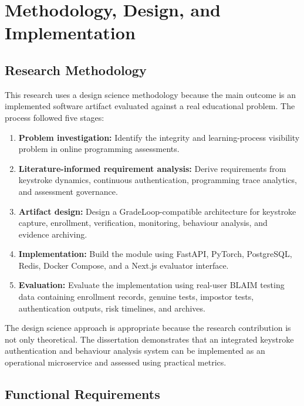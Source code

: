 \chapter{Methodology, Design, and Implementation}
\label{chap:methodology}

\section{Research Methodology}
\label{sec:methodology}

This research uses a design science methodology because the main outcome is an implemented software artifact evaluated against a real educational problem. The process followed five stages:

\begin{enumerate}
  \item \textbf{Problem investigation:} Identify the integrity and learning-process visibility problem in online programming assessments.
  \item \textbf{Literature-informed requirement analysis:} Derive requirements from keystroke dynamics, continuous authentication, programming trace analytics, and assessment governance.
  \item \textbf{Artifact design:} Design a GradeLoop-compatible architecture for keystroke capture, enrollment, verification, monitoring, behaviour analysis, and evidence archiving.
  \item \textbf{Implementation:} Build the module using FastAPI, PyTorch, PostgreSQL, Redis, Docker Compose, and a Next.js evaluator interface.
  \item \textbf{Evaluation:} Evaluate the implementation using real-user BLAIM testing data containing enrollment records, genuine tests, impostor tests, authentication outputs, risk timelines, and archives.
\end{enumerate}

The design science approach is appropriate because the research contribution is not only theoretical. The dissertation demonstrates that an integrated keystroke authentication and behaviour analysis system can be implemented as an operational microservice and assessed using practical metrics.

\section{Functional Requirements}
\label{sec:functional-requirements}


